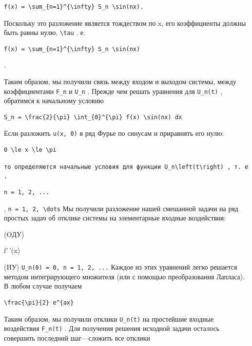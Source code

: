 \documentclass[
  ukrainian,
]{article}
\begin{document}
\begin{verbatim}
f(x) = \sum_{n=1}^{\infty} S_n \sin(nx).
\end{verbatim}

Поскольку это разложение является тождеством по x, его коэффициенты
должны быть равны нулю, \texttt{\textbackslash{}tau} . е.

\begin{verbatim}
f(x) = \sum_{n=1}^{\infty} S_n \sin(nx)
\end{verbatim}

.

Таким образом, мы получили связь между входом и выходом системы, между
коэффициентами \texttt{F\_n} и \texttt{U\_n} . Прежде чем решать
уравнения для \texttt{U\_n(t)} , обратимся к начальному условию

\begin{verbatim}
S_n = \frac{2}{\pi} \int_{0}^{\pi} f(x) \sin(nx) dx
\end{verbatim}

Если разложить \texttt{u(x,\ 0)} в ряд Фурье по синусам и приравнять его
нулю:

\begin{verbatim}
0 \le x \le \pi
\end{verbatim}

\texttt{то\ определяются\ начальные\ условия\ для\ функции\ \textquotesingle{}U\_n\textbackslash{}left(t\textbackslash{}right)\textquotesingle{}\ ,\ т.\ е.}

\begin{verbatim}
n = 1, 2, ...
\end{verbatim}

, \texttt{n\ =\ 1,\ 2,\ \textbackslash{}dots} Мы получили разложение
нашей смешанной задачи на ряд простых задач об отклике системы на
элементарные входные воздействия:

(OДУ)

f'\,'(x)

(HУ) \texttt{U\_n(0)\ =\ 0,\ n\ =\ 1,\ 2,\ ...} Каждое из этих уравнений
легко решается методом интегрирующего множителя (или с помощью
преобразования Лапласа). В любом случае получаем

\begin{verbatim}
\frac{\pi}{2} e^{ax}
\end{verbatim}

Таким образом, мы получили отклики \texttt{U\_n(t)} на простейшие
входные воздействия \texttt{F\_n(t)} . Для получения решения исходной
задачи осталось совершить последний шаг---сложить все отклики
\end{document}
